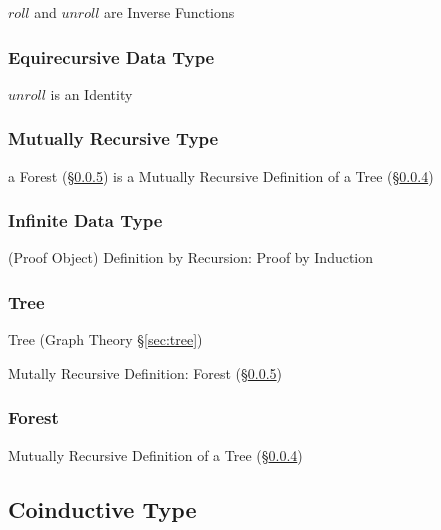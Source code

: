 $roll$ and $unroll$ are Inverse Functions



\subsubsection{Equirecursive Data Type}\label{sec:equirecursive_type}

$unroll$ is an Identity



\subsubsection{Mutually Recursive Type}
\label{sec:mutually_recursive}\hfill

a Forest (\S\ref{sec:forest_type}) is a Mutually Recursive Definition
of a Tree (\S\ref{sec:tree_type})



\subsubsection{Infinite Data Type}\label{sec:infinite_datatype}

(Proof Object) Definition by Recursion: Proof by Induction



\subsubsection{Tree}\label{sec:tree_type}

Tree (Graph Theory \S\ref{sec:tree})

Mutally Recursive Definition: Forest (\S\ref{sec:forest_type})



\subsubsection{Forest}\label{sec:forest_type}

Mutually Recursive Definition of a Tree (\S\ref{sec:tree_type})



\subsection{Coinductive Type}\label{sec:coinductive_type}


